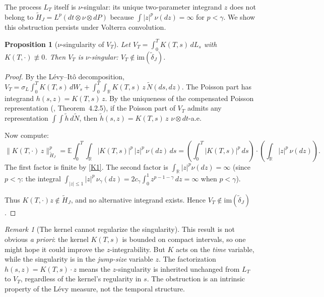 \documentclass[11pt,a4paper]{article}
\theoremstyle{plain}
\newtheorem{proposition}[theorem]{Proposition}
\theoremstyle{definition}
\theoremstyle{remark}
\newtheorem{remark}[theorem]{Remark}
\newcommand{\E}{\mathbb{E}}
\newcommand{\R}{\mathbb{R}}
\newcommand{\im}{\mathrm{im}}
\newcommand{\Ntilde}{\widetilde{N}}
\begin{document}
The process $L_T$ itself is
$\nu$-singular: its unique two-parameter integrand $z$ does not
belong to $\widetilde{H}_J = L^p(dt \otimes \nu \otimes dP)$
because $\int|z|^p\,\nu(dz) = \infty$ for $p < \gamma$.  We
show this obstruction persists under Volterra convolution.

\begin{proposition}[$\nu$-singularity of $V_T$]
\label{prop:VT-singular}
Let $V_T = \int_0^T K(T,s)\,dL_s$ with $K(T,\cdot) \not\equiv 0$.
Then $V_T$ is $\nu$-singular: $V_T \notin \im(\widetilde{\delta}_J)$.
\end{proposition}

\begin{proof}
By the L\'evy--It\^o decomposition,
$V_T = \sigma_L\int_0^T K(T,s)\,dW_s
+ \int_0^T\!\!\int_\R K(T,s)\,z\,\Ntilde(ds,dz)$.
The Poisson part has integrand $h(s,z) = K(T,s)\,z$.
By the uniqueness of the compensated Poisson representation
(\cite{Applebaum2009}, Theorem~4.2.5), if the Poisson part
of $V_T$ admits any representation
$\int\!\!\int \tilde{h}\,d\Ntilde$, then
$\tilde{h}(s,z) = K(T,s)\,z$ $\nu \otimes dt$-a.e.

Now compute:
\[
  \|K(T,\cdot)\,z\|_{\widetilde{H}_J}^p
  = \E\!\int_0^T\!\!\int_\R |K(T,s)|^p\,|z|^p\,\nu(dz)\,ds
  = \left(\int_0^T |K(T,s)|^p\,ds\right)
  \cdot\left(\int_\R |z|^p\,\nu(dz)\right).
\]
The first factor is finite by \ref{K1}.
The second factor is $\int_\R|z|^p\nu(dz) = \infty$
(since $p < \gamma$: the integral
$\int_{|z|\leq 1}|z|^p\,\nu_\gamma(dz)
= 2c_\gamma\int_0^1 z^{p-1-\gamma}\,dz = \infty$
when $p < \gamma$).

Thus $K(T,\cdot)z \notin \widetilde{H}_J$, and no alternative
integrand exists.  Hence
$V_T \notin \im(\widetilde{\delta}_J)$.
\end{proof}

\begin{remark}[The kernel cannot regularize the singularity]
\label{rem:kernel-cannot-regularize}
This result is not obvious \emph{a priori}: the kernel
$K(T,s)$ is bounded on compact intervals, so one might
hope it could improve the $z$-integrability.  But $K$
acts on the \emph{time} variable, while the singularity is
in the \emph{jump-size} variable $z$.  The factorization
$h(s,z) = K(T,s) \cdot z$ means the $z$-singularity is
inherited unchanged from $L_T$ to $V_T$, regardless of the
kernel's regularity in $s$.  The obstruction is an intrinsic
property of the L\'evy measure, not the temporal structure.
\end{remark}
\end{document}
